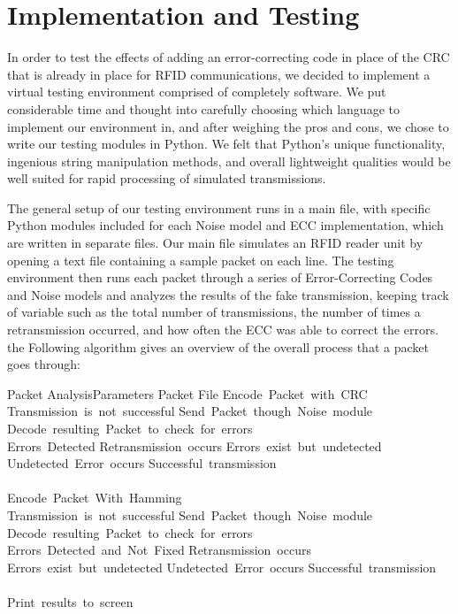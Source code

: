 \documentclass{sigcomm-alternate}
\begin{document}
\section{Implementation and Testing}
In order to test the effects of adding an error-correcting code in place of the CRC that is already in place for RFID communications, we decided to implement a virtual testing environment comprised of completely software. We put considerable time and thought into carefully choosing which language to implement our environment in, and after weighing the pros and cons, we chose to write our testing modules in Python. We felt that Python's unique functionality, ingenious string manipulation methods, and overall lightweight qualities would be well suited for rapid processing of simulated transmissions.

The general setup of our testing environment runs in a main file, with specific Python modules included for each Noise model and ECC implementation, which are written in separate files. Our main file simulates an RFID reader unit by opening a text file containing a sample packet on each line. The testing environment then runs each packet through a series of Error-Correcting Codes and Noise models and analyzes the results of the fake transmission, keeping track of variable such as the total number of transmissions, the number of times a retransmission occurred, and how often the ECC was able to correct the errors. the Following algorithm gives an overview of the overall process that a packet goes through:

\begin{pseudocode}{Packet Analysis}{Parameters}
\FOREACH Packet \in File 
	\DO
	\BEGIN
		Encode\ Packet\ with\ CRC\\
		\WHILE Transmission\ is\ not\ successful
			\DO
			\BEGIN
				Send\ Packet\ though\ Noise\ module\\
				Decode\ resulting\ Packet\ to\ check\ for\ errors\\
				\IF Errors\ Detected
					\THEN
					\BEGIN
						Retransmission\ occurs
					\END
				\ELSEIF Errors\ exist\ but\ undetected
					\THEN
					\BEGIN
						Undetected\ Error\ occurs
					\END
				\ELSE
					Successful\ transmission
			\END\\\\
		Encode\ Packet\ With\ Hamming\\
		\WHILE Transmission\ is\ not\ successful
			\DO
			\BEGIN
				Send\ Packet\ though\ Noise\ module\\
				Decode\ resulting\ Packet\ to\ check\ for\ errors\\
				\IF Errors\ Detected\ and\ Not\ Fixed
					\THEN
					\BEGIN
						Retransmission\ occurs
					\END
				\ELSEIF Errors\ exist\ but\ undetected
					\THEN
					\BEGIN
						Undetected\ Error\ occurs
					\END
				\ELSE
					Successful\ transmission
			\END
	\END\\\\
	
Print\ results\ to\ screen
\end{pseudocode}
\end{document}

